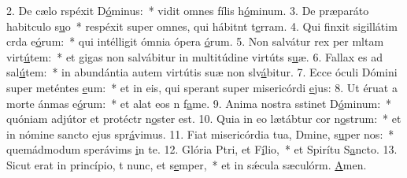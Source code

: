 2. De cælo rspéxit D\uline{ó}minus:~* vidit omnes fílis h\uline{ó}minum.
3. De præparáto habitculo s\uline{u}o~* respéxit super omnes, qui hábitnt t\uline{e}rram.
4. Qui finxit sigillátim crda e\uline{ó}rum:~* qui intélligit ómnia ópera \uline{ó}rum.
5. Non salvátur rex per mltam virt\uline{ú}tem:~* et gigas non salvábitur in multitúdine virtúts s\uline{u}æ.
6. Fallax es ad sal\uline{ú}tem:~* in abundántia autem virtútis suæ non slv\uline{á}bitur.
7. Ecce óculi Dómini super meténtes \uline{e}um:~* et in eis, qui sperant super misericórdi \uline{e}jus:
8. Ut éruat a morte ánmas e\uline{ó}rum:~* et alat eos n f\uline{a}me.
9. Anima nostra sstinet D\uline{ó}minum:~* quóniam adjútor et protéctr n\uline{o}ster est.
10. Quia in eo lætábtur cor n\uline{o}strum:~* et in nómine sancto ejus spr\uline{á}vimus.
11. Fiat misericórdia tua, Dmine, s\uline{u}per nos:~* quemádmodum sperávims \uline{i}n te.
12. Glória Ptri, et F\uline{í}lio,~* et Spirítu S\uline{a}ncto.
13. Sicut erat in princípio, t nunc, et s\uline{e}mper,~* et in sǽcula sæculórm. \uline{A}men.
